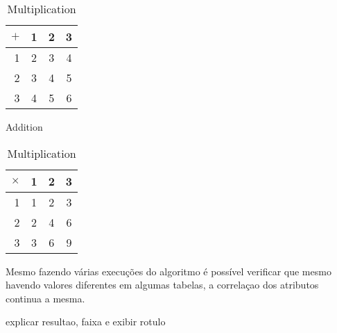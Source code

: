 \begin{table}[t]
        \begin{minipage}{0.5\textwidth}
            \centering
            \begin{tabular}{r | c c c}
                $+$
                  & 1 & 2 & 3 \\\hline
                1 & 2 & 3 & 4 \\
                2 & 3 & 4 & 5 \\
                3 & 4 & 5 & 6
            \end{tabular}
            \caption{Addition}
        \end{minipage}
        \hfillx
        \begin{minipage}{0.5\textwidth}
            \centering
            \begin{tabular}{r | c c c}
                $\times$
                  & 1 & 2 & 3 \\\hline
                1 & 1 & 2 & 3 \\
                2 & 2 & 4 & 6 \\
                3 & 3 & 6 & 9
            \end{tabular}
            \caption{Multiplication}
        \end{minipage}
\end{table}

Mesmo fazendo várias execuções do algoritmo é possível verificar que mesmo havendo  valores diferentes em algumas tabelas, a correlaçao dos atributos continua a mesma.

explicar resultao, faixa e exibir rotulo






